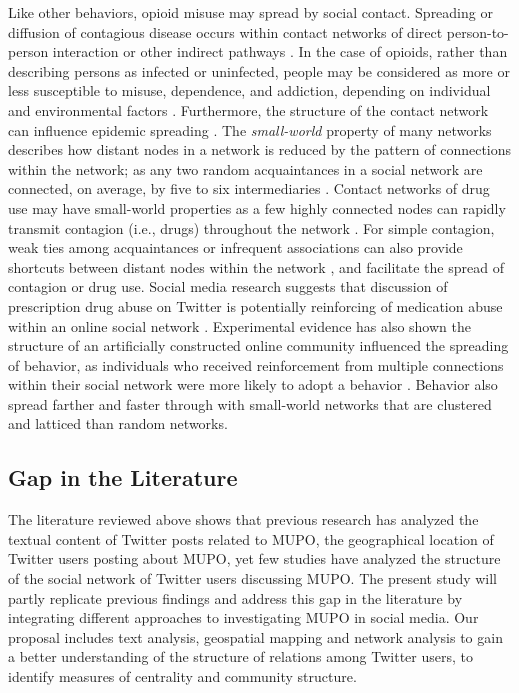\documentclass[sigconf]{acmart}
\begin{document}
Like other behaviors, opioid misuse may spread by social contact. Spreading 
or diffusion of contagious disease occurs within contact networks of direct 
person-to-person interaction or other indirect pathways \cite{pastor01}. In 
the case of opioids, rather than describing persons as infected or uninfected, 
people may be considered as more or less susceptible to misuse, dependence, and 
addiction, depending on individual and environmental factors \cite{volkow14}. 
Furthermore, the structure of the contact network can influence epidemic 
spreading \cite{watts98}. The \emph{small-world} property of many networks 
describes how distant nodes in a network is reduced by the pattern of connections 
within the network; as any two random acquaintances in a social network are 
connected, on average, by five to six intermediaries \cite{tramil69}. Contact
networks of drug use may have small-world properties as a few highly connected 
nodes can rapidly transmit contagion (i.e., drugs) throughout the network 
\cite{shaham03}. For simple contagion, weak ties among acquaintances or 
infrequent associations can also provide shortcuts between distant nodes within 
the network \cite{granovetter73}, and facilitate the spread of contagion or 
drug use. Social media research suggests that discussion of prescription drug 
abuse on Twitter is potentially reinforcing of medication abuse within an 
online social network \cite{hanson13}. Experimental evidence has also shown 
the structure of an artificially constructed online community influenced the 
spreading of behavior, as individuals who received reinforcement from multiple 
connections within their social network were more likely to adopt a behavior 
\cite{centola10}. Behavior also spread farther and faster through with 
small-world networks that are clustered and latticed than random networks.


\subsection{Gap in the Literature} 

The literature reviewed above shows that previous research has analyzed the 
textual content of Twitter posts related to MUPO, the geographical location of 
Twitter users posting about MUPO, yet few studies have analyzed the structure 
of the social network of Twitter users discussing MUPO. The present study will 
partly replicate previous findings and address this gap in the literature by 
integrating different approaches to investigating MUPO in social media. Our 
proposal includes text analysis, geospatial mapping and network analysis to 
gain a better understanding of the structure of relations among Twitter users, 
to identify measures of centrality and community structure. 
\end{document}

